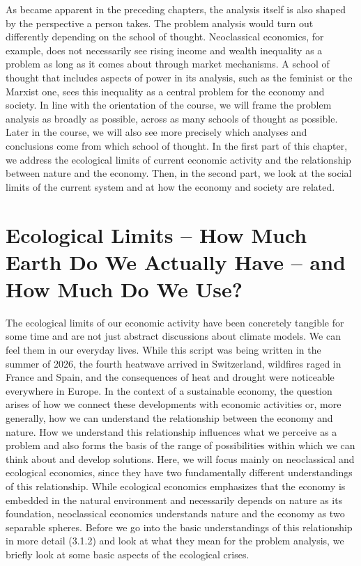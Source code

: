 \documentclass[
  british,
  a4paper,
  DIV=11,
  numbers=noendperiod,
  oneside,
  openany]{scrreprt}
\begin{document}
As became apparent in the preceding chapters, the analysis itself is
also shaped by the perspective a person takes. The problem analysis
would turn out differently depending on the school of thought.
Neoclassical economics, for example, does not necessarily see rising
income and wealth inequality as a problem as long as it comes about
through market mechanisms. A school of thought that includes aspects of
power in its analysis, such as the feminist or the Marxist one, sees
this inequality as a central problem for the economy and society. In
line with the orientation of the course, we will frame the problem
analysis as broadly as possible, across as many schools of thought as
possible. Later in the course, we will also see more precisely which
analyses and conclusions come from which school of thought. In the first
part of this chapter, we address the ecological limits of current
economic activity and the relationship between nature and the economy.
Then, in the second part, we look at the social limits of the current
system and at how the economy and society are related.

\section{Ecological Limits -- How Much Earth Do We Actually Have -- and
How Much Do We
Use?}\label{ecological-limits-how-much-earth-do-we-actually-have-and-how-much-do-we-use}

The ecological limits of our economic activity have been concretely
tangible for some time and are not just abstract discussions about
climate models. We can feel them in our everyday lives. While this
script was being written in the summer of 2026, the fourth heatwave
arrived in Switzerland, wildfires raged in France and Spain, and the
consequences of heat and drought were noticeable everywhere in Europe.
In the context of a sustainable economy, the question arises of how we
connect these developments with economic activities or, more generally,
how we can understand the relationship between the economy and nature.
How we understand this relationship influences what we perceive as a
problem and also forms the basis of the range of possibilities within
which we can think about and develop solutions. Here, we will focus
mainly on neoclassical and ecological economics, since they have two
fundamentally different understandings of this relationship. While
ecological economics emphasizes that the economy is embedded in the
natural environment and necessarily depends on nature as its foundation,
neoclassical economics understands nature and the economy as two
separable spheres. Before we go into the basic understandings of this
relationship in more detail (3.1.2) and look at what they mean for the
problem analysis, we briefly look at some basic aspects of the
ecological crises.
\end{document}
